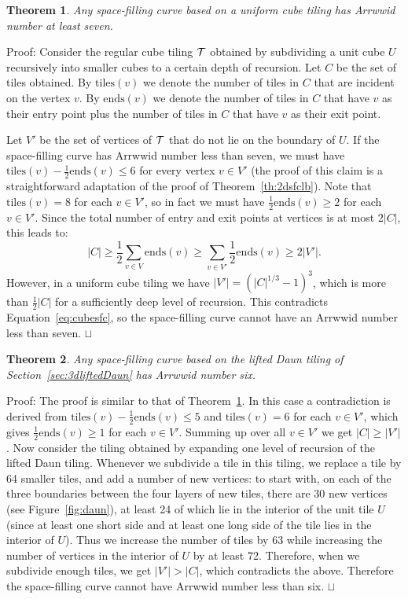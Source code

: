 \documentclass[11pt,a4paper]{article}
\newcommand{\unittile}{\ensuremath{U}\xspace}
\newcommand{\tdegr}{\mathrm{tiles}}
\newcommand{\doors}{\mathrm{ends}}
\newtheorem{theorem}{Theorem}
\newenvironment{proof}{Proof:}{\qed}
\def\squareforqed{\hbox{\rlap{$\sqcap$}$\sqcup$}}
\def\qed{\ifmmode\squareforqed\else{\unskip\nobreak\hfil
\penalty50\hskip1em\null\nobreak\hfil\squareforqed
\parfillskip=0pt\finalhyphendemerits=0\endgraf}\fi}
\begin{document}
\begin{theorem}\label{th:cubesfc}
Any space-filling curve based on a uniform cube tiling has Arrwwid number at least seven.
\end{theorem}
\begin{proof}
Consider the regular cube tiling ${\cal T}$ obtained by subdividing a unit cube \unittile recursively into smaller cubes to a certain depth of recursion. Let $C$ be the set of tiles obtained. By $\tdegr(v)$ we denote the number of tiles in $C$ that are incident on the vertex $v$. By $\doors(v)$ we denote the number of tiles in $C$ that have $v$ as their entry point plus the number of tiles in $C$ that have $v$ as their exit point.

Let $V'$ be the set of vertices of ${\cal T}$ that do not lie on the boundary of \unittile. If the space-filling curve has Arrwwid number less than seven, we must have $\tdegr(v) - \frac12 \doors(v) \leq 6$ for every vertex $v \in V'$ (the proof of this claim is a straightforward adaptation of the proof of Theorem~\ref{th:2dsfclb}). Note that $\tdegr(v) = 8$ for each $v \in V'$, so in fact we must have $\frac12 \doors(v) \geq 2$ for each $v \in V'$. Since the total number of entry and exit points at vertices is at most $2|C|$, this leads to:\begin{equation}\label{eq:cubesfc}
|C| \geq \frac12 \sum_{v \in V} \doors(v) \geq \sum_{v \in V'} \frac12 \doors(v) \geq 2|V'|.
\end{equation}
However, in a uniform cube tiling we have $|V'| = (|C|^{1/3} - 1)^3$, which is more than $\frac12 |C|$ for a sufficiently deep level of recursion. This contradicts Equation~\ref{eq:cubesfc}, so the space-filling curve cannot have an Arrwwid number less than seven.
\end{proof}

\begin{theorem}
Any space-filling curve based on the lifted Daun tiling of Section~\ref{sec:3dliftedDaun} has Arrwwid number six.
\end{theorem}
\begin{proof}
The proof is similar to that of Theorem~\ref{th:cubesfc}. In this case a contradiction is derived from $\tdegr(v) - \frac12 \doors(v) \leq 5$ and $\tdegr(v) = 6$ for each $v \in V'$, which gives $\frac12 \doors(v) \geq 1$ for each $v \in V'$. Summing up over all $v \in V'$ we get $|C| \geq |V'|$. Now consider the tiling obtained by expanding one level of recursion of the lifted Daun tiling. Whenever we subdivide a tile in this tiling, we replace a tile by 64 smaller tiles, and add a number of new vertices: to start with, on each of the three boundaries between the four layers of new tiles, there are 30 new vertices (see Figure~\ref{fig:daun}), at least 24 of which lie in the interior of the unit tile \unittile (since at least one short side and at least one long side of the tile lies in the interior of \unittile). Thus we increase the number of tiles by 63 while increasing the number of vertices in the interior of \unittile by at least 72. Therefore, when we subdivide enough tiles, we get $|V'| > |C|$, which contradicts the above. Therefore the space-filling curve cannot have Arrwwid number less than six.
\end{proof}
\end{document}
